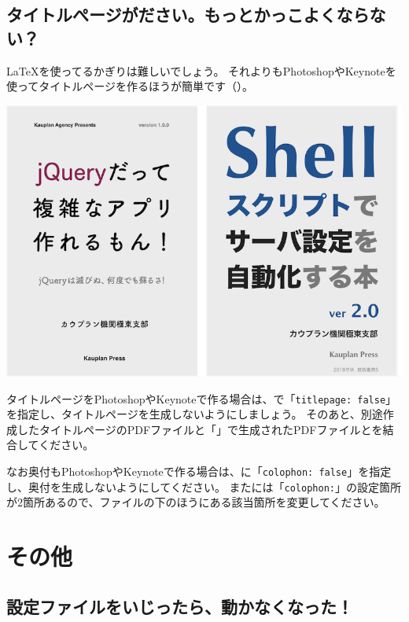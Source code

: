 \subsection{タイトルぺージがださい。もっとかっこよくならない？}
\label{sec:2-6-2}

\LaTeX{}を使ってるかぎりは難しいでしょう。
それよりもPhotoshopやKeynoteを使ってタイトルページを作るほうが簡単です（）。

\begin{reviewimage}%
\includegraphics[width=\maxwidth]{./images/chap02-faq/titlepage-samples.png}%
\label{image:chap02-faq:titlepage-samples}
\end{reviewimage}

タイトルページをPhotoshopやKeynoteで作る場合は、で「\texttt{titlepage: false}」を指定し、タイトルページを生成しないようにしましょう。
そのあと、別途作成したタイトルページのPDFファイルと「」で生成されたPDFファイルとを結合してください。

なお奥付もPhotoshopやKeynoteで作る場合は、に「\texttt{colophon: false}」を指定し、奥付を生成しないようにしてください。
またには「\texttt{colophon:}」の設定箇所が2箇所あるので、ファイルの下のほうにある該当箇所を変更してください。

\section{その他}
\label{sec:2-7}

\subsection{設定ファイルをいじったら、動かなくなった！}
\label{sec:2-7-1}

